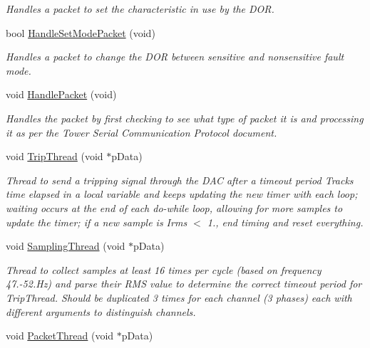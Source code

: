 \begin{DoxyCompactItemize}
\begin{DoxyCompactList}\small\item\em Handles a packet to set the characteristic in use by the D\+O\+R. \end{DoxyCompactList}\item 
bool \hyperlink{group__main__module_ga9ea461c220078e580f655d0904e06a15}{Handle\+Set\+Mode\+Packet} (void)
\begin{DoxyCompactList}\small\item\em Handles a packet to change the D\+O\+R between sensitive and nonsensitive fault mode. \end{DoxyCompactList}\item 
void \hyperlink{group__main__module_gab7a5cb735555819b24719d6078028181}{Handle\+Packet} (void)
\begin{DoxyCompactList}\small\item\em Handles the packet by first checking to see what type of packet it is and processing it as per the Tower Serial Communication Protocol document. \end{DoxyCompactList}\item 
\hypertarget{group__main__module_ga1a74db037b63425694b8fc3365b59ec2}{}void \hyperlink{group__main__module_ga1a74db037b63425694b8fc3365b59ec2}{Trip\+Thread} (void $\ast$p\+Data)\label{group__main__module_ga1a74db037b63425694b8fc3365b59ec2}

\begin{DoxyCompactList}\small\item\em Thread to send a tripping signal through the D\+A\+C after a timeout period Tracks time elapsed in a local variable and keeps updating the new timer with each loop; waiting occurs at the end of each do-\/while loop, allowing for more samples to update the timer; if a new sample is Irms $<$ 1., end timing and reset everything. \end{DoxyCompactList}\item 
\hypertarget{group__main__module_gaf57aa549d9f31f77159135d6d2ae8de1}{}void \hyperlink{group__main__module_gaf57aa549d9f31f77159135d6d2ae8de1}{Sampling\+Thread} (void $\ast$p\+Data)\label{group__main__module_gaf57aa549d9f31f77159135d6d2ae8de1}

\begin{DoxyCompactList}\small\item\em Thread to collect samples at least 16 times per cycle (based on frequency 47.-\/52.\+Hz) and parse their R\+M\+S value to determine the correct timeout period for Trip\+Thread. Should be duplicated 3 times for each channel (3 phases) each with different arguments to distinguish channels. \end{DoxyCompactList}\item 
\hypertarget{group__main__module_ga94108820cbd6ec7384be98059164df0e}{}void \hyperlink{group__main__module_ga94108820cbd6ec7384be98059164df0e}{Packet\+Thread} (void $\ast$p\+Data)\label{group__main__module_ga94108820cbd6ec7384be98059164df0e}


\end{DoxyCompactItemize}
